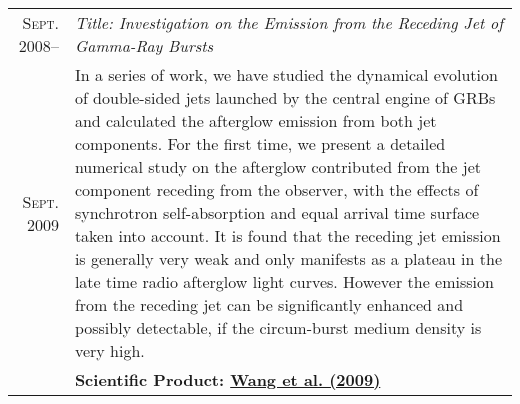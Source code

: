 \documentclass[letterpaper,10pt]{article}
\begin{document}
\begin{longtable}{r|p{5.5in}}
  \textsc{Sept. 2008}--  &   \emph{Title: Investigation on the Emission from the Receding Jet of Gamma-Ray Bursts}   \\
  \textsc{Sept. 2009}    &   \small{In a series of work, we have studied the dynamical evolution of double-sided jets launched by 
  the central engine of GRBs and calculated the afterglow emission from both jet components. For the first time, we present a 
  detailed numerical study on the afterglow contributed from the jet component receding from the observer, with the effects of 
  synchrotron self-absorption and equal arrival time surface taken into account. It is found that the receding jet emission is 
  generally very weak and only manifests as a plateau in the late time radio afterglow light curves. However the emission from the 
  receding jet can be significantly enhanced and possibly detectable, if the circum-burst medium density is very high.} \\
  &   \textbf{Scientific Product: \hyperlink{09.wang.aa}{Wang et al. (2009)}} \\
\end{longtable}

\end{document}
